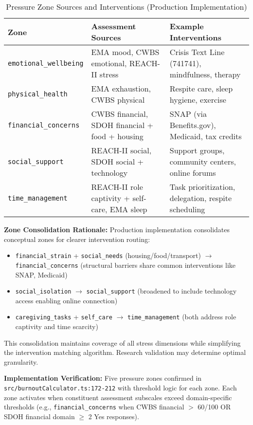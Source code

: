 \documentclass{article}
\begin{document}
\begin{table}[h]
\centering
\caption{Pressure Zone Sources and Interventions (Production Implementation)}
\label{table:pressure_zones}
\small
\begin{tabular}{lp{4.5cm}p{4.5cm}}
\toprule
\textbf{Zone} & \textbf{Assessment Sources} & \textbf{Example Interventions} \\
\midrule
\texttt{emotional\_wellbeing} & EMA mood, CWBS emotional, REACH-II stress & Crisis Text Line (741741), mindfulness, therapy \\
\texttt{physical\_health} & EMA exhaustion, CWBS physical & Respite care, sleep hygiene, exercise \\
\texttt{financial\_concerns} & CWBS financial, SDOH financial + food + housing & SNAP (via Benefits.gov), Medicaid, tax credits \\
\texttt{social\_support} & REACH-II social, SDOH social + technology & Support groups, community centers, online forums \\
\texttt{time\_management} & REACH-II role captivity + self-care, EMA sleep & Task prioritization, delegation, respite scheduling \\
\bottomrule
\end{tabular}
\end{table}

\textbf{Zone Consolidation Rationale:} Production implementation consolidates conceptual zones for clearer intervention routing:
\begin{itemize}
    \item \texttt{financial\_strain} + \texttt{social\_needs} (housing/food/transport) $\rightarrow$ \texttt{financial\_concerns} (structural barriers share common interventions like SNAP, Medicaid)
    \item \texttt{social\_isolation} $\rightarrow$ \texttt{social\_support} (broadened to include technology access enabling online connection)
    \item \texttt{caregiving\_tasks} + \texttt{self\_care} $\rightarrow$ \texttt{time\_management} (both address role captivity and time scarcity)
\end{itemize}

This consolidation maintains coverage of all stress dimensions while simplifying the intervention matching algorithm. Research validation may determine optimal granularity.

\textbf{Implementation Verification:} Five pressure zones confirmed in \texttt{src/burnoutCalculator.ts:172-212} with threshold logic for each zone. Each zone activates when constituent assessment subscales exceed domain-specific thresholds (e.g., \texttt{financial\_concerns} when CWBS financial $>$ 60/100 OR SDOH financial domain $\geq$ 2 Yes responses).
\end{document}
